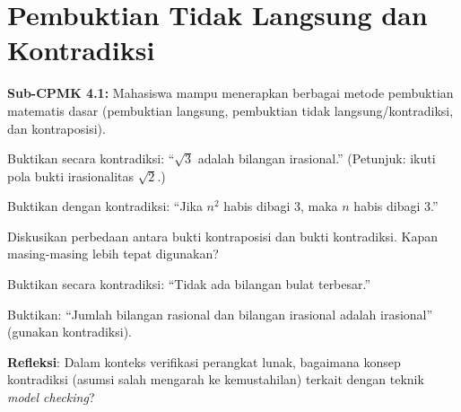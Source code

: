 \documentclass[../main]{subfiles}
\begin{document}
\chapter{Pembuktian Tidak Langsung dan Kontradiksi}

\begin{subcpmk}
  \item \textbf{Sub-CPMK 4.1:} Mahasiswa mampu menerapkan berbagai metode pembuktian matematis dasar (pembuktian langsung, pembuktian tidak langsung/kontradiksi, dan kontraposisi).
\end{subcpmk}



\begin{aktivitas}
  \item Buktikan secara kontradiksi: ``$\sqrt{3}$ adalah bilangan irasional.'' (Petunjuk: ikuti pola bukti irasionalitas $\sqrt{2}$.)
  \item Buktikan dengan kontradiksi: ``Jika $n^2$ habis dibagi 3, maka $n$ habis dibagi 3.''
  \item Diskusikan perbedaan antara bukti kontraposisi dan bukti kontradiksi. Kapan masing-masing lebih tepat digunakan?
\end{aktivitas}

\begin{latihan}
  \item Buktikan secara kontradiksi: ``Tidak ada bilangan bulat terbesar.''
  \item Buktikan: ``Jumlah bilangan rasional dan bilangan irasional adalah irasional'' (gunakan kontradiksi).
  \item \textbf{Refleksi}: Dalam konteks verifikasi perangkat lunak, bagaimana konsep kontradiksi (asumsi salah mengarah ke kemustahilan) terkait dengan teknik \textit{model checking}?
\end{latihan}
\end{document}
